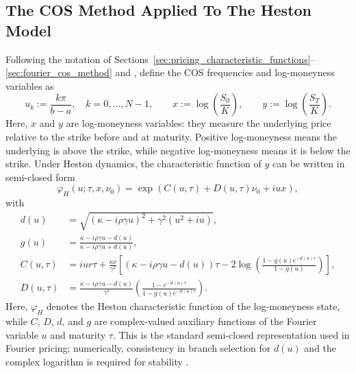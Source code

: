 \subsection{The COS Method Applied To The Heston Model}
Following the notation of Sections~\ref{sec:pricing_characteristic_functions}--\ref{sec:fourier_cos_method} and \cite[Sec.~3]{fang_oosterlee_2009}, define the COS frequencies and log-moneyness variables as
\[
u_k:=\frac{k\pi}{b-a},\quad k=0,\ldots,N-1,\qquad x:=\log\!\left(\frac{S_0}{K}\right),\qquad y:=\log\!\left(\frac{S_T}{K}\right).
\]
Here, $x$ and $y$ are log-moneyness variables: they measure the underlying price relative to the strike before and at maturity. Positive log-moneyness means the underlying is above the strike, while negative log-moneyness means it is below the strike.
Under Heston dynamics, the characteristic function of $y$ can be written in semi-closed form \cite{heston,rouah_heston_book}
\begin{equation}
    \label{eq:heston_log_moneyness_cf}
    \varphi_H(u;\tau,x,\nu_0)=\exp\!\left(C(u,\tau)+D(u,\tau)\nu_0+iux\right),
\end{equation}
with
\begin{equation}
\begin{aligned}
    d(u)&=\sqrt{\left(\kappa-i\rho\gamma u\right)^2+\gamma^2\left(u^2+iu\right)},\\
    g(u)&=\frac{\kappa-i\rho\gamma u-d(u)}{\kappa-i\rho\gamma u+d(u)},\\
    C(u,\tau)&=iur\tau+\frac{\kappa\bar\nu}{\gamma^2}\!\left[\left(\kappa-i\rho\gamma u-d(u)\right)\tau-2\log\!\left(\frac{1-g(u)e^{-d(u)\tau}}{1-g(u)}\right)\right],\\
    D(u,\tau)&=\frac{\kappa-i\rho\gamma u-d(u)}{\gamma^2}\left(\frac{1-e^{-d(u)\tau}}{1-g(u)e^{-d(u)\tau}}\right).
\end{aligned}
\end{equation}
Here, $\varphi_H$ denotes the Heston characteristic function of the log-moneyness state, while $C$, $D$, $d$, and $g$ are complex-valued auxiliary functions of the Fourier variable $u$ and maturity $\tau$. This is the standard semi-closed representation used in Fourier pricing; numerically, consistency in branch selection for $d(u)$ and the complex logarithm is required for stability \cite[Chs.~2--3]{rouah_heston_book}.

